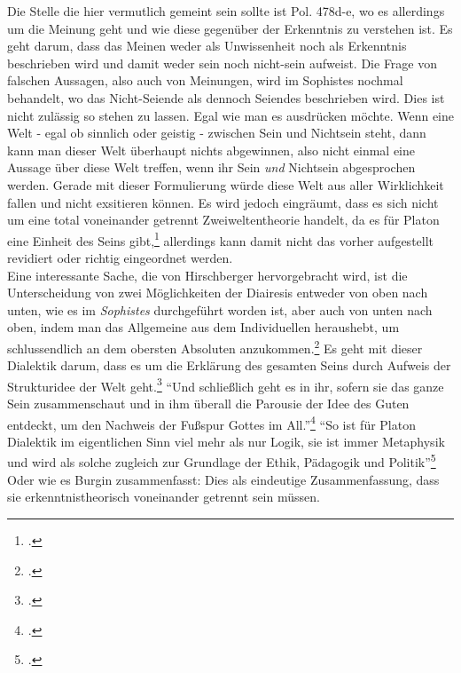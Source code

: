 Die Stelle die hier vermutlich gemeint sein sollte ist Pol. 478d-e, wo es allerdings um die Meinung geht und wie diese gegenüber der Erkenntnis zu verstehen ist. Es geht darum, dass das Meinen weder als Unwissenheit noch als Erkenntnis beschrieben wird und damit weder sein noch nicht-sein aufweist. Die Frage von falschen Aussagen, also auch von Meinungen, wird im Sophistes nochmal behandelt, wo das Nicht-Seiende als dennoch Seiendes beschrieben wird. 
Dies ist nicht zulässig so stehen zu lassen. Egal wie man es ausdrücken möchte. Wenn eine Welt - egal ob sinnlich oder geistig - zwischen Sein und Nichtsein steht, dann kann man dieser Welt überhaupt nichts abgewinnen, also nicht einmal eine Aussage über diese Welt treffen, wenn ihr Sein \emph{und} Nichtsein abgesprochen werden. 
Gerade mit dieser Formulierung würde diese Welt aus aller Wirklichkeit fallen und nicht exsitieren können.
Es wird jedoch eingräumt, dass es sich nicht um eine total voneinander getrennt Zweiweltentheorie handelt, da es für Platon eine Einheit des Seins gibt,\footcite[vgl][S. 100]{Hirschberger} allerdings kann damit nicht das vorher aufgestellt revidiert oder richtig eingeordnet werden.\\
Eine interessante Sache, die von Hirschberger hervorgebracht wird, ist die Unterscheidung von zwei Möglichkeiten der Diairesis entweder von oben nach unten, wie es im \emph{Sophistes} durchgeführt worden ist, aber auch von unten nach oben, indem man das Allgemeine aus dem Individuellen heraushebt, um schlussendlich an dem obersten Absoluten anzukommen.\footcite[vgl.][S. 106f.]{Hirschberger} 
Es geht mit dieser Dialektik darum, dass es um die Erklärung des gesamten Seins durch Aufweis der Strukturidee der Welt geht.\footcite[vgl.][S. 107]{Hirschberger}
\enquote{Und schließlich geht es in ihr, sofern sie das ganze Sein zusammenschaut und in ihm überall die Parousie der Idee des Guten entdeckt, um den Nachweis der Fußspur Gottes im All.}\footcite[][S. 107]{Hirschberger}
\enquote{So ist für Platon Dialektik im eigentlichen Sinn viel mehr als nur Logik, sie ist immer Metaphysik und wird als solche zugleich zur Grundlage der Ethik, Pädagogik und Politik}\footcite[][S. 108]{Hirschberger}
Oder wie es Burgin zusammenfasst: 
Dies als eindeutige Zusammenfassung, dass sie erkenntnistheorisch voneinander getrennt sein müssen.


